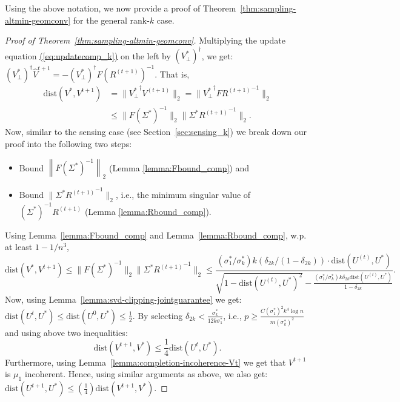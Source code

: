 \documentclass[11pt]{article}
\renewcommand{\eqref}[1]{\hyperref[#1]{(\ref*{#1})}}
\theoremstyle{plain}
\theoremstyle{definition}
\newcommand{\dist}{\mathrm{dist}}
\newcommand{\twonorm}[1]{\left\| {#1} \right\|_2}
\newcommand{\Vt}{V^{t+1}}
\newcommand{\Vht}{\widehat{V}^{t+1}}
\newcommand{\Ut}{U^{t}}
\newcommand{\Rt}{R^{(t+1)}}
\newcommand{\Vo}{V^*}
\newcommand{\Uo}{U^*}
\newcommand{\so}{\sigma^*}
\begin{document}
Using the above notation, we now provide a proof of Theorem~\ref{thm:sampling-altmin-geomconv} for the general rank-$k$ case. 
\begin{proof}[Proof of Theorem~\ref{thm:sampling-altmin-geomconv}]
Multiplying the update equation \eqref{eq:updatecomp_k} on the left by $\left(\Vo_{\perp}\right)^{\dag}$, we get:\\
$(\Vo_{\perp})^{\dag}\Vht=-(\Vo_{\perp})^{\dag}F (\Rt)^{-1}.$ That is, 
\begin{align*}\dist(V^*, V^{t+1})&=\|{V_{\perp}^*}^\dag V^{(t+1)}\|_2=\|{V_{\perp}^*}^\dag  F {R^{(t+1)}}^{-1}\|_2\\&\leq \|F(\Sigma^*)^{-1}\|_2\|\Sigma^*{R^{(t+1)}}^{-1}\|_2.\end{align*}
Now, similar to the sensing case (see Section~\ref{sec:sensing_k}) we break down our proof into the following two steps:
\begin{itemize}
  \item Bound $\twonorm{F(\Sigma^*)^{-1}}$  (Lemma \ref{lemma:Fbound_comp}) and
  \item Bound $\|\Sigma^*{R^{(t+1)}}^{-1}\|_2$, i.e., the minimum singular value of $\left(\Sigma^*\right)^{-1}R^{(t+1)}$ (Lemma \ref{lemma:Rbound_comp}).
\end{itemize}
Using Lemma~\ref{lemma:Fbound_comp} and Lemma~\ref{lemma:Rbound_comp}, w.p. at least $1-1/n^3$, 
\begin{equation*}\dist(V^*, V^{t+1})\leq \|F(\Sigma^*)^{-1}\|_2\|\Sigma^*{R^{(t+1)}}^{-1}\|_2 \leq  \frac{(\sigma^*_1/\sigma^*_k)k(\delta_{2k}/(1-\delta_{2k}))  \cdot \dist\left(U^{(t)},U^*\right)}{\sqrt{1-\dist\left(U^{(t)},U^*\right)^2} - 
			\frac{(\sigma^*_1/\sigma^*_k)k\delta_{2k}  \dist\left(U^{(t)},U^*\right)}{1-\delta_{2k}}}.\end{equation*}
Now, using Lemma~\ref{lemma:svd-clipping-jointguarantee} we get: $\dist(U^t, U^*)\leq \dist(U^0, U^*)\leq \frac{1}{2}$. By selecting $\delta_{2k}<\frac{\so_k}{12k\so_1}$, i.e., $p\geq \frac{C(\so_1)^2k^4\log n}{m(\so_k)^2}$ and using above two inequalities:
$$\dist(\Vt, \Vo)\leq \frac{1}{4}\dist(\Ut, \Uo).$$
Furthermore, using Lemma~\ref{lemma:completion-incoherence-Vt} we get that $\Vt$ is $\mu_1$ incoherent. 
Hence, using similar arguments as above, we also get:
$\dist(U^{t+1}, \Uo)\leq \left(\frac{1}{4}\right)\dist(\Vt, \Vo).$ %

\end{proof}
\end{document}
